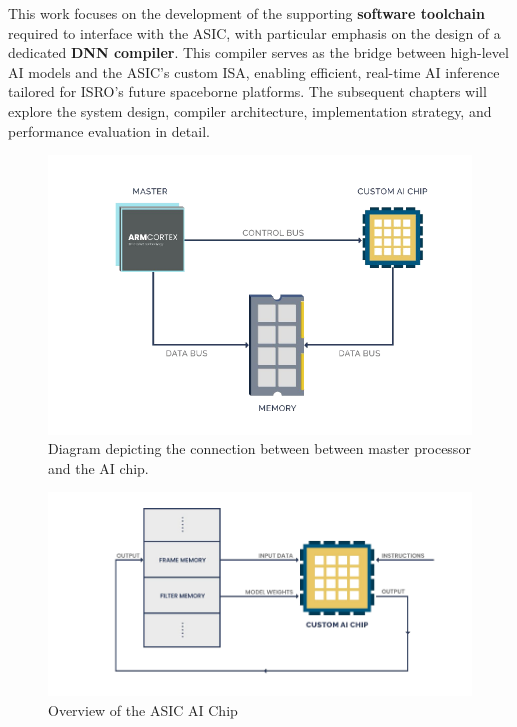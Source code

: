 \documentclass[12pt]{report}
\begin{document}
This work focuses on the development of the supporting \textbf{software toolchain} required to interface with the ASIC, with particular emphasis on the design of a dedicated \textbf{DNN compiler}. This compiler serves as the bridge between high-level AI models and the ASIC's custom ISA, enabling efficient, real-time AI inference tailored for ISRO's future spaceborne platforms. The subsequent chapters will explore the system design, compiler architecture, implementation strategy, and performance evaluation in detail.

\begin{figure}[!b]
\centering
  \includegraphics[width=\textwidth]{system_overview1.png}
  \caption{Diagram depicting the connection between between master processor and the AI chip.}
  \label{label5}
\end{figure}


\begin{figure}[!b]
\centering
  \includegraphics[width=\textwidth]{asic_data_flow1.png}
  \caption{Overview of the ASIC AI Chip}
  \label{label3}
\end{figure}
\end{document}
